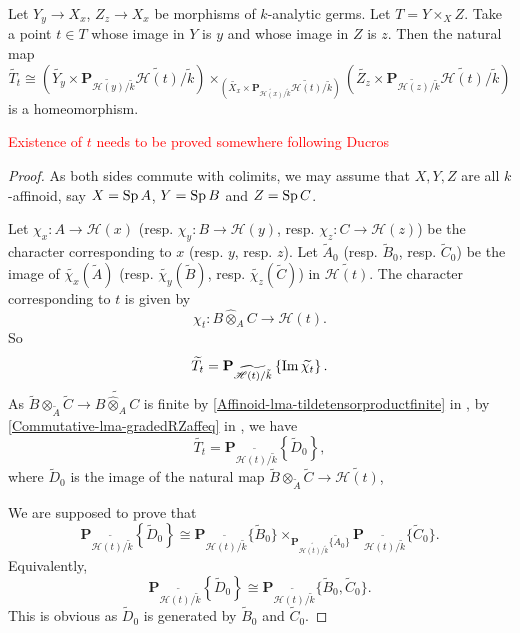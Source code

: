 \begin{lemma}\label{lma-fiberproductreduction1}
    Let $Y_y\rightarrow X_x$, $Z_z\rightarrow X_x$ be morphisms of $k$-analytic germs. Let $T=Y\times_X Z$. Take a point $t\in T$ whose image in $Y$ is $y$ and whose image in $Z$ is $z$. Then the natural map
    \[
        \widetilde{T_t}\cong \left(\widetilde{Y_y}\times \mathbf{P}_{\widetilde{\mathscr{H}(y)}/\tilde{k}}\widetilde{\mathscr{H}(t)}/\tilde{k}\right)\times_{\left(\widetilde{X_x}\times \mathbf{P}_{\widetilde{\mathscr{H}(x)}/\tilde{k}}\widetilde{\mathscr{H}(t)}/\tilde{k}\right)}\left(\widetilde{Z_z}\times \mathbf{P}_{\widetilde{\mathscr{H}(z)}/\tilde{k}}\widetilde{\mathscr{H}(t)}/\tilde{k}\right)  
    \]
    is a homeomorphism.
\end{lemma}
\textcolor{red}{Existence of $t$ needs to be proved somewhere following Ducros}
\begin{proof}
    As both sides commute with colimits, we may assume that $X,Y,Z$ are all $k$-affinoid, say $X=\operatorname{Sp} A$, $Y=\operatorname{Sp} B$ and $Z=\operatorname{Sp} C$.

    Let $\chi_x:A\rightarrow \mathscr{H}(x)$ (resp. $\chi_y:B\rightarrow \mathscr{H}(y)$, resp. $\chi_z:C\rightarrow \mathscr{H}(z)$) be the character corresponding to $x$ (resp. $y$, resp. $z$).
    Let $\tilde{A}_0$ (resp. $\tilde{B}_0$, resp. $\tilde{C}_0$) be the image of $\widetilde{\chi_x}(\tilde{A})$ (resp. $\widetilde{\chi_y}(\tilde{B})$, resp. $\widetilde{\chi_z}(\tilde{C})$) in $\widetilde{\mathscr{H}(t)}$. 
    The character corresponding to $t$ is given by
    \[
        \chi_t:B\hat{\otimes}_A C\rightarrow \mathscr{H}(t). 
    \]
    So
    \[
        \widetilde{T_t}=  \mathbf{P}_{\widetilde{\mathscr{H}(t)/\tilde{k}}}\left\{ \operatorname{Im} \widetilde{\chi_t}\right\}.
    \]
    As $\tilde{B}\otimes_{\tilde{A}}\tilde{C}\rightarrow \widetilde{B\hat{\otimes}_A C}$ is finite by \cref{Affinoid-lma-tildetensorproductfinite} in , by \cref{Commutative-lma-gradedRZaffeq} in , we have
    \[
        \widetilde{T_t}=  \mathbf{P}_{\widetilde{\mathscr{H}(t)/\tilde{k}}}\left\{ \tilde{D}_0\right\}, 
    \]
    where $\tilde{D}_0$ is the image of the natural map $\tilde{B}\otimes_{\tilde{A}}\tilde{C}\rightarrow \widetilde{\mathscr{H}(t)}$,
    
    We are supposed to prove that 
    \[
        \mathbf{P}_{\widetilde{\mathscr{H}(t)/\tilde{k}}}\left\{ \tilde{D}_0\right\}\cong \mathbf{P}_{\widetilde{\mathscr{H}(t)/\tilde{k}}}\{\tilde{B}_0\} \times_{\mathbf{P}_{\widetilde{\mathscr{H}(t)/\tilde{k}}}\{\tilde{A}_0\}}\mathbf{P}_{\widetilde{\mathscr{H}(t)/\tilde{k}}}\{\tilde{C}_0\}.
    \]
    Equivalently,
    \[
        \mathbf{P}_{\widetilde{\mathscr{H}(t)/\tilde{k}}}\left\{ \tilde{D}_0\right\}\cong \mathbf{P}_{\widetilde{\mathscr{H}(t)/\tilde{k}}}\{\tilde{B}_0,\tilde{C}_0\}. 
    \]
    This is obvious as $\tilde{D}_0$ is generated by $\tilde{B}_0$ and $\tilde{C}_0$.
\end{proof}

